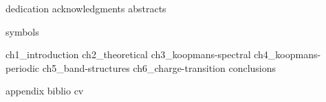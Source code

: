 \documentclass[a4paper,11pt]{book}
\begin{document}
\setlength{\parindent}{0pt}
\frontmatter


\setlength{\parskip}{0.5em}

{dedication}
\setcounter{page}{0}
{acknowledgments}
{abstracts}

\setlength{\parskip}{0pt}

\cleardoublepage
{}
{\hypersetup{hidelinks} \tableofcontents}

\cleardoublepage
{}
{}
{\hypersetup{hidelinks} \listoffigures}
 
\cleardoublepage
{}
{}
{\hypersetup{hidelinks} \listoftables}

\cleardoublepage
{}
{symbols}

\setlength{\parskip}{1em}


\mainmatter
%
{ch1_introduction}
\cleardoublepage
%
{ch2_theoretical}
\cleardoublepage
%
{ch3_koopmans-spectral}
\cleardoublepage
%
{ch4_koopmans-periodic}
\cleardoublepage
%
{ch5_band-structures}
\cleardoublepage
%
{ch6_charge-transition}
\cleardoublepage
%
{conclusions}
\cleardoublepage

\cleardoublepage
{}


{appendix}
\backmatter
{biblio}
{cv}
\end{document}
